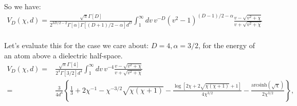 So we have:
\begin{align}
V_D(\chi,d)=\frac{\sqrt{\pi}\Gamma[D]}{2^{3D/2-2}\Gamma[\alpha]\Gamma\left[(D+1)/2-\alpha\right]d^D}
\int_{1}^\infty dv\,v^{-D}(v^2-1)^{(D-1)/2-\alpha}\frac{v-\sqrt{v^2+\chi}}{v+\sqrt{v^2+\chi  }}\nonumber \\
\end{align}

Let's evaluate this for the case we care about: $D=4,\alpha=3/2$, 
for the energy of an atom above a dielectric half-space.
\begin{align}
V_D(\chi,d)=&\frac{\sqrt{\pi}\Gamma[4]}{2^{4}\Gamma[3/2]d^4}\int_{1}^\infty dv\,v^{-4}\frac{v-\sqrt{v^2+\chi}}{v+\sqrt{v^2+\chi  }}\nonumber \\
=&\frac{3}{4d^4}\left\{ \frac{1}{3}+2\chi^{-1}- \chi^{-3/2}\sqrt{\chi  (\chi +1)} 
-\frac{\log \left[2 \chi +2 \sqrt{\chi  (\chi+1)}+1\right]}{4 \chi^{3/2}}
-\frac{\text{arcsinh}\left(\sqrt{\chi }\right)}{2\chi^{3/2}}\right\},
\end{align}





